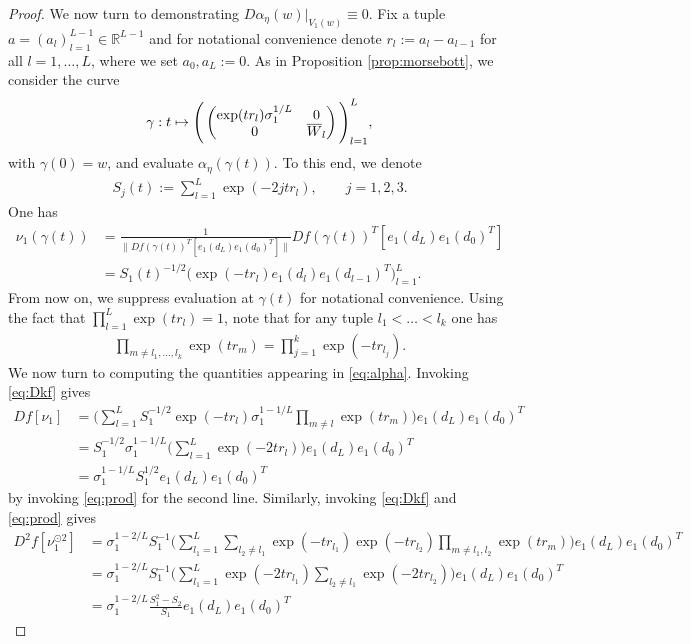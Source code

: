 \documentclass[10pt,a4paper]{amsart}
\newcommand{\RB}{\mathbb{R}}
\newcommand{\bW}{\smash{\overline{W}}\vphantom{W}}
\begin{document}
\begin{proof}
    We now turn to demonstrating $D\alpha_{\eta}(w)|_{V_1(w)}\equiv 0$. Fix a tuple $a = (a_l)_{l=1}^{L-1}\in\RB^{L-1}$ and for notational convenience denote $r_l:=a_l-a_{l-1}$ for all $l=1,\dots,L$, where we set $a_0,a_L:=0$. As in Proposition \ref{prop:morsebott}, we consider the curve
    \begin{align}
    \gamma:t\mapsto \Bigg(\begin{pmatrix}\exp(tr_l)\sigma_1^{1/L} & 0 \\ 0 & \bW_l\end{pmatrix}\Bigg)_{l=1}^L,
    \end{align}
    with $\gamma(0) = w$, and evaluate $\alpha_{\eta}(\gamma(t))$. To this end, we denote
    \begin{align}
    S_j(t):=\sum_{l=1}^L\exp(-2jtr_l),\qquad j=1,2,3.
    \end{align}
    One has
    \begin{align}
    \nu_1(\gamma(t)) &= \frac{1}{\|Df(\gamma(t))^T[e_1(d_L)e_1(d_0)^T]\|}Df(\gamma(t))^T[e_1(d_L)e_1(d_0)^T]\\&=S_1(t)^{-1/2}\big(\exp(-tr_l)e_1(d_l)e_1(d_{l-1})^T\big)_{l=1}^L.
    \end{align}
    From now on, we suppress evaluation at $\gamma(t)$ for notational convenience. Using the fact that $\prod_{l=1}^L\exp(tr_l) = 1$, note that for any tuple $l_1<\dots<l_k$ one has
    \begin{align}\label{eq:prod}
        \prod_{m\neq l_1,\dots,l_k}\exp(tr_m) = \prod_{j=1}^k\exp(-tr_{l_j}).
    \end{align}
    We now turn to computing the quantities appearing in \eqref{eq:alpha}. Invoking \eqref{eq:Dkf} gives
    \begin{align}
        Df[\nu_1] &= \bigg(\sum_{l=1}^LS_1^{-1/2}\exp(-tr_l)\sigma_1^{1-1/L}\prod_{m\neq l}\exp(tr_m)\bigg)e_1(d_L)e_1(d_0)^T\\&=S_1^{-1/2}\sigma_1^{1-1/L}\bigg(\sum_{l=1}^L\exp(-2tr_l)\bigg)e_1(d_L)e_1(d_0)^T\\&=\sigma_1^{1-1/L}S_1^{1/2}e_1(d_L)e_1(d_0)^T
    \end{align}
    by invoking \eqref{eq:prod} for the second line. Similarly, invoking \eqref{eq:Dkf} and \eqref{eq:prod} gives
    \begin{align}
        D^2f[\nu_1^{\odot 2}] &= \sigma_1^{1-2/L}S_1^{-1}\bigg(\sum_{l_1=1}^L\sum_{l_2\neq l_1}\exp(-tr_{l_1})\exp(-tr_{l_2})\prod_{m\neq l_1,l_2}\exp(tr_m)\bigg)e_1(d_L)e_1(d_0)^T\\&=\sigma_1^{1-2/L}S_1^{-1}\bigg(\sum_{l_1=1}^L\exp(-2tr_{l_1})\sum_{l_2\neq l_1}\exp(-2tr_{l_2})\bigg)e_1(d_L)e_1(d_0)^T\\&=\sigma_1^{1-2/L}\frac{S_1^2-S_2}{S_1}e_1(d_L)e_1(d_0)^T

\end{align}
\end{proof}
\end{document}
